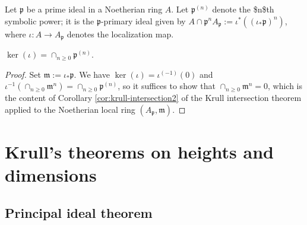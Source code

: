 \documentclass[10pt]{article}
\begin{document}
Let \(\mathfrak{p}\) be a prime ideal in a Noetherian ring \(A\).
Let \(\mathfrak{p}^{(n)}\) denote the \$n\$th symbolic power;
it is the $\mathfrak{p}$-primary ideal
given by \(A \cap \mathfrak{p}^n A_\mathfrak{p} := \iota^*(
  (\iota_* \mathfrak{p} )^n)\),
where \(\iota : A \rightarrow A_\mathfrak{p}\) denotes the
localization map.
\begin{theorem}
  $\ker(\iota) = \cap_{n \geq 0} \mathfrak{p}^{(n)}$.
\end{theorem}
\begin{proof}
  Set $\mathfrak{m} := \iota_* \mathfrak{p}$.  We have
  $\ker(\iota) = \iota^{(-1)}(0)$ and
  $\iota^{-1}(\cap_{n \geq 0} \mathfrak{m}^n) = \cap_{n \geq 0}
  \mathfrak{p}^{(n)}$, so it suffices to show that
  $\cap_{n \geq 0} \mathfrak{m}^n = 0$, which is the content of
  Corollary \ref{cor:krull-intersection2} of the Krull
  intersection theorem applied to the Noetherian local ring
  $(A_\mathfrak{p},\mathfrak{m})$.
\end{proof}


\section{Krull's theorems on heights and dimensions}
\label{sec:orgd3770e5}
\subsection{Principal ideal theorem}
\label{sec:orgb8870ab}
\end{document}
